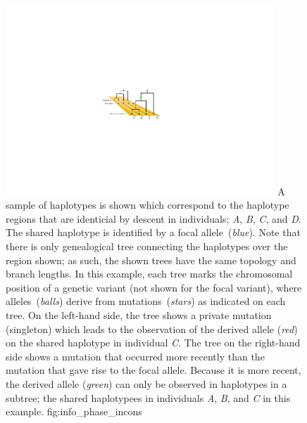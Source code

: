

\begin{figure}[!htb]
\centering
\includegraphics[width=0.9\textwidth]{./img/ch3/info_phase_incons}
{A sample of  haplotypes is shown which correspond to the haplotype regions that are identicial by descent in  individuals; \emph{A}, \emph{B}, \emph{C}, and \emph{D}.
The shared haplotype is identified by a focal allele~(\emph{blue}).
Note that there is only  genealogical tree connecting the  haplotypes over the region shown; as such, the  shown trees have the same topology and branch lengths.
In this example, each tree marks the chromosomal position of a genetic variant (not shown for the focal variant), where alleles~(\emph{balls}) derive from mutations~(\emph{stars}) as indicated on each tree.
On the left-hand side, the tree shows a private mutation (singleton) which leads to the observation of the derived allele (\emph{red}) on the shared haplotype in individual \emph{C}.
The tree on the right-hand side shows a mutation that occurred more recently than the mutation that gave rise to the focal allele.
Because it is more recent, the derived allele (\emph{green}) can only be observed in haplotypes in a subtree; \ie the shared haplotypees in individuals \emph{A}, \emph{B}, and \emph{C} in this example.}
{fig:info_phase_incons}
\end{figure}
